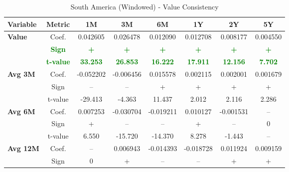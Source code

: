 \documentclass[11pt,english,a4paper,hidelinks]{book}
\begin{document}
\begin{table}[H]
    \centering
    \caption{South America (Windowed) - Value Consistency}
    \begin{tabular}{lccccccc}
        \toprule
        \textbf{Variable} & \textbf{Metric} & \textbf{1M} & \textbf{3M} & \textbf{6M} & \textbf{1Y} & \textbf{2Y} & \textbf{5Y} \\
        \midrule
        \multirow{3}{*}{\textbf{Value}}
            & Coef.   & 0.042605  & 0.026478  & 0.012090  & 0.012708  & 0.008177  & 0.004550  \\
            & \textbf{\textcolor{green}{Sign}}
                     & \textbf{\textcolor{green}{+}}
                     & \textbf{\textcolor{green}{+}}
                     & \textbf{\textcolor{green}{+}}
                     & \textbf{\textcolor{green}{+}}
                     & \textbf{\textcolor{green}{+}}
                     & \textbf{\textcolor{green}{+}} \\
            & \textbf{\textcolor{green}{t-value}}
                     & \textbf{\textcolor{green}{33.253}}
                     & \textbf{\textcolor{green}{26.853}}
                     & \textbf{\textcolor{green}{16.222}}
                     & \textbf{\textcolor{green}{17.911}}
                     & \textbf{\textcolor{green}{12.156}}
                     & \textbf{\textcolor{green}{7.702}} \\
        \cmidrule{1-8}
        \multirow{3}{*}{\textbf{Avg 3M}}
            & Coef.   & -0.052202 & -0.006456 & 0.015578  & 0.002115  & 0.002001  & 0.001679  \\
            & Sign    & –         & –         & +         & +         & +         & +         \\
            & t-value & -29.413   & -4.363    & 11.437    & 2.012     & 2.116     & 2.286     \\
        \cmidrule{1-8}
        \multirow{3}{*}{\textbf{Avg 6M}}
            & Coef.   & 0.007253  & -0.030704 & -0.019211 & 0.010127  & -0.001531 & --        \\
            & Sign    & +         & –         & –         & +         & –         & 0         \\
            & t-value & 6.550     & -15.720   & -14.370   & 8.278     & -1.443    & --        \\
        \cmidrule{1-8}
        \multirow{3}{*}{\textbf{Avg 12M}}
            & Coef.   & --        & 0.006943  & -0.014393 & -0.018728 & 0.011924  & 0.009159  \\
            & Sign    & 0         & +         & –         & –         & +         & +         \\

\end{tabular}
\end{table}
\end{document}
